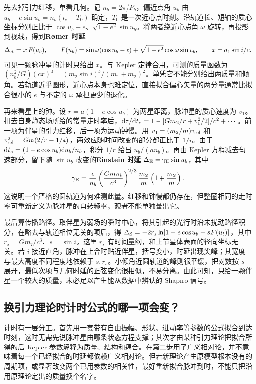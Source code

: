 先去掉引力红移，单看几何。记 $n_b=2\pi/P_b$，偏近点角 $u_b$ 由 $u_b-e\sin u_b=n_b(t_e-T_0)$ 确定，$T_0$ 是一次近心点时刻。沿轨道长、短轴的质心坐标分别正比于 $\cos u_b-e$、$\sqrt{1-e^2}\sin u_b$。将两者绕近心点角 $\omega$ 旋转，再投影到视线，得到\textbf{R\o mer 时延}
\[
 \Delta_{\rm R}=x\,F(u_b),\qquad
 F(u_b)=\sin\omega(\cos u_b-e)+\sqrt{1-e^2}\cos\omega\sin u_b,
 \qquad x=a_1\sin i/c .
\]
可见一颗脉冲星的计时只给出 $x$。与 Kepler 定律合用，可测的质量函数为 $(n_b^2/G)(cx)^3=(m_2\sin i)^3/(m_1+m_2)^2$。单凭它不能分别给出两质量和倾角。若轨道近乎圆形，近心点本身也难定位，直接拟合偏心矢量的两分量通常比拟合很小的 $e$ 与不定的 $\omega$ 承担更少的退化。

再来看星上的钟。设 $r=a(1-e\cos u_b)$ 为两星距离，脉冲星的质心速度为 $v_1$。扣去自身静态场所给的常量走时率后，$\dd\tau/\dd t_e=1-[Gm_2/r+v_1^2/2]/c^2+\cdots$。前一项为伴星的引力红移，后一项为运动钟慢。用 $v_1=(m_2/m)v_{\rm rel}$ 和 $v_{\rm rel}^2=Gm(2/r-1/a)$，两效应随时间改变的部分都正比于 $1/r$。由于 $\dd t_e=(1-e\cos u_b)\dd u_b/n_b$，积分 $1/r$ 给出 $u_b/(a n_b)$。再由 Kepler 方程减去匀速部分，留下随 $\sin u_b$ 改变的\textbf{Einstein 时延} $\Delta_{\rm E}=\gamma_{\rm E}\sin u_b$，其中
\[
 \gamma_{\rm E}=
 \frac{e}{n_b}\left(\frac{Gmn_b}{c^3}\right)^{2/3}
 \frac{m_2}{m}\left(1+\frac{m_2}{m}\right).
\]
这说明一个严格的圆轨道为何难测此量。红移和钟慢都仍存在，但整圈相同的走时率可重新定义为脉冲星的自转频率，观者不能单独量出它。

最后算传播路径。取伴星为弱场的瞬时中心，将其引起的光行时沿未扰动路径积分，在略去与轨道相位无关的项后，得 $\Delta_{\rm S}=-2r_s\ln[1-e\cos u_b-sF(u_b)]$，其中 $r_s=Gm_2/c^3$、$s=\sin i$。这里 $r_s$ 有时间量纲，和上节星体表面的径向坐标无关。若 $i$ 接近直角，脉冲在上合时贴近伴星，括号变小，时延出现尖峰；其宽度与最大高度不同程度地依赖于 $s,r_s$。小倾角近圆轨道的峰则很平缓，把对数按 $s$ 展开，最低次项与几何时延的正弦变化很相似，不易分离。由此可知，只给一颗伴星一个较大的质量，未必足以产生能从数据中辨认的 Shapiro 信号。

\subsection{换引力理论时计时公式的哪一项会变？}

计时有一层分工。首先用一套带有自由振幅、形状、进动率等参数的公式拟合到达时刻，这时无需先说脉冲星由哪条状态方程支撑；其次才由某种引力理论把拟合所得的后 Kepler 参数解释为质量、结构和耦合。在第二步用了广义相对论，并不意味着每一个已经拟合的时延都依赖广义相对论。但若新理论产生原模型根本没有的周期项，或显著改变两个已用参数的相关性，最好重新拟合脉冲到时，不能只把沿用原理论定出的质量换个名字。

